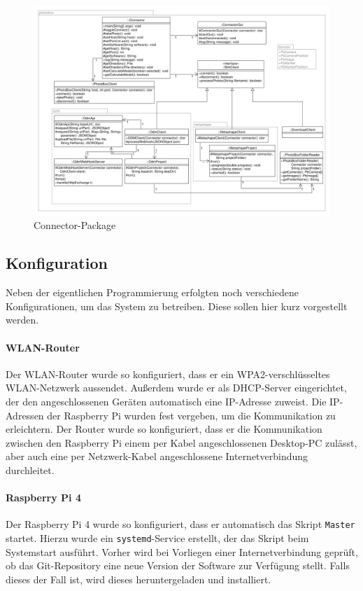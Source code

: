 \documentclass[./00PhotoBox.tex]{subfiles}
\begin{document}
\begin{figure}
    \centering
    \includegraphics[width=1\textwidth]{./img/uml/uml_connector_classdiagramm.pdf}
    \caption{Connector-Package} %
    \label{img:uml_connector} %
\end{figure}

\subsection{Konfiguration}
Neben der eigentlichen Programmierung erfolgten noch verschiedene Konfigurationen, um das System zu betreiben. Diese sollen hier kurz vorgestellt werden.

\paragraph{WLAN-Router}
Der WLAN-Router wurde so konfiguriert, dass er ein WPA2-ver\-schlüssel\-tes WLAN-Netzwerk aussendet. Außerdem wurde er als DHCP-Server eingerichtet, der den angeschlossenen Geräten automatisch eine IP-Adresse zuweist. Die IP-Adressen der Raspberry Pi wurden fest vergeben, um die Kommunikation zu erleichtern. Der Router wurde so konfiguriert, dass er die Kommunikation zwischen den Raspberry Pi einem per Kabel angeschlossenen Desktop-PC zulässt, aber auch eine per Netzwerk-Kabel angeschlossene Internetverbindung durchleitet.

\paragraph{Raspberry Pi 4}
Der Raspberry Pi 4 wurde so konfiguriert, dass er automatisch das Skript \texttt{Master} startet. Hierzu wurde ein \texttt{systemd}-Service erstellt, der das Skript beim Systemstart ausführt. Vorher wird bei Vorliegen einer Internetverbindung geprüft, ob das Git-Repository eine neue Version der Software zur Verfügung stellt. Falls dieses der Fall ist, wird dieses heruntergeladen und installiert.
\end{document}
